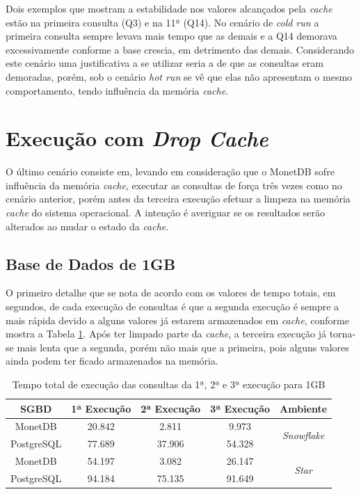 
Dois exemplos que mostram a estabilidade nos valores alcançados pela \textit{cache} estão na primeira consulta (Q3) e na 11ª (Q14). No cenário de \textit{cold run} a primeira consulta sempre levava mais tempo que as demais e a Q14 demorava excessivamente conforme a base crescia, em detrimento das demais. Considerando este cenário uma justificativa a se utilizar seria a de que as consultas eram demoradas, porém, sob o cenário \textit{hot run} se vê que elas não apresentam o mesmo comportamento, tendo influência da memória \textit{cache}.

\section{Execução com \textit{Drop Cache}}

O último cenário consiste em, levando em consideração que o MonetDB sofre influência da memória \textit{cache}, executar as consultas de força três vezes como no cenário anterior, porém antes da terceira execução efetuar a limpeza na memória \textit{cache} do sistema operacional. A intenção é averiguar se os resultados serão alterados ao mudar o estado da \textit{cache}.

\subsection{Base de Dados de 1GB}

O primeiro detalhe que se nota de acordo com os valores de tempo totais, em segundos, de cada execução de consultas é que a segunda execução é sempre a mais rápida devido a alguns valores já estarem armazenados em \textit{cache}, conforme mostra a Tabela \ref{tab:queries_cache_1}. Após ter limpado parte da \textit{cache}, a terceira execução já torna-se mais lenta que a segunda, porém não mais que a primeira, pois alguns valores ainda podem ter ficado armazenados na memória.

\begin{table}[htpb]
        \centering
        \caption{Tempo total de execução das consultas da 1ª, 2ª e 3ª execução para 1GB}
        \label{tab:queries_cache_1}
        \begin{tabular}{|c|c|c|c|c|}
        \hline
        SGBD       & 1ª Execução & 2ª Execução & 3ª Execução & Ambiente                            \\ \hline
        MonetDB    & 20.842      & 2.811       & 9.973       & \multirow{2}{*}{\textit{Snowflake}} \\ \cline{1-4}
        PostgreSQL & 77.689      & 37.906      & 54.328      &                                     \\ \hline
        MonetDB    & 54.197      & 3.082       & 26.147      & \multirow{2}{*}{\textit{Star}}      \\ \cline{1-4}
        PostgreSQL & 94.184      & 75.135      & 91.649      &                                     \\ \hline
        \end{tabular}
\end{table}


